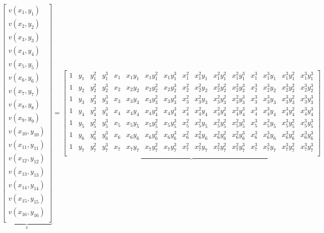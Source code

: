 \documentclass[a4paper, landscape]{article}
\begin{document}
\begin{equation}
    \underbrace{
    \begin{bmatrix}
        v(x_1, y_1)\\
        v(x_2, y_2)\\
        v(x_3, y_3)\\
        v(x_4, y_4)\\
        v(x_5, y_5)\\
        v(x_6, y_6)\\
        v(x_7, y_7)\\
        v(x_8, y_8)\\
        v(x_9, y_9)\\
        v(x_{10}, y_{10})\\
        v(x_{11}, y_{11})\\
        v(x_{12}, y_{12})\\
        v(x_{13}, y_{13})\\
        v(x_{14}, y_{14})\\
        v(x_{15}, y_{15})\\
        v(x_{16}, y_{16})\\
    \end{bmatrix}
    }_{v}=
    \underbrace{
    \begin{bmatrix}
        1 & y_1 & y_1^2 & y_1^3 & x_1 & x_1y_1 & x_1y_1^2 & x_1y_1^3 & x_1^2 & x_1^2y_1 & x_1^2y_1^2 & x_1^2y_1^3 & x_1^3 & x_1^3y_1 & x_1^3y_1^2 & x_1^3y_1^3\\
        1 & y_2 & y_2^2 & y_2^3 & x_2 & x_2y_2 & x_2y_2^2 & x_2y_2^3 & x_2^2 & x_2^2y_2 & x_2^2y_2^2 & x_2^2y_2^3 & x_2^3 & x_2^3y_2 & x_2^3y_2^2 & x_2^3y_2^3\\
        1 & y_3 & y_3^2 & y_3^3 & x_3 & x_3y_3 & x_3y_3^2 & x_3y_3^3 & x_3^2 & x_3^2y_3 & x_3^2y_3^2 & x_3^2y_3^3 & x_3^3 & x_3^3y_3 & x_3^3y_3^2 & x_3^3y_3^3\\
        1 & y_4 & y_4^2 & y_4^3 & x_4 & x_4y_4 & x_4y_4^2 & x_4y_4^3 & x_4^2 & x_4^2y_4 & x_4^2y_4^2 & x_4^2y_4^3 & x_4^3 & x_4^3y_4 & x_4^3y_4^2 & x_4^3y_4^3\\
        1 & y_5 & y_5^2 & y_5^3 & x_5 & x_5y_5 & x_5y_5^2 & x_5y_5^3 & x_5^2 & x_5^2y_5 & x_5^2y_5^2 & x_5^2y_5^3 & x_5^3 & x_5^3y_5 & x_5^3y_5^2 & x_5^3y_5^3\\
        1 & y_6 & y_6^2 & y_6^3 & x_6 & x_6y_6 & x_6y_6^2 & x_6y_6^3 & x_6^2 & x_6^2y_6 & x_6^2y_6^2 & x_6^2y_6^3 & x_6^3 & x_6^3y_6 & x_6^3y_6^2 & x_6^3y_6^3\\
        1 & y_7 & y_7^2 & y_7^3 & x_7 & x_7y_7 & x_7y_7^2 & x_7y_7^3 & x_7^2 & x_7^2y_7 & x_7^2y_7^2 & x_7^2y_7^3 & x_7^3 & x_7^3y_7 & x_7^3y_7^2 & x_7^3y_7^3\\

\end{bmatrix}}
\end{equation}
\end{document}
